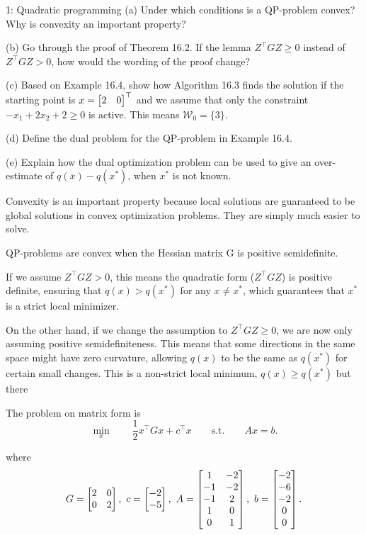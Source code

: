 
\begin{problem}{1: Quadratic programming}
  (a) Under which conditions is a QP-problem convex? Why is convexity an important property?
  
  \medskip (b) Go through the proof of Theorem 16.2. If the lemma $Z^{\top}GZ \geq 0$ instead of $Z^{\top}GZ > 0$, how would the wording of the proof change?
  
  \medskip (c) Based on Example 16.4, show how Algorithm 16.3 finds the solution if the starting point is 
  $x = \begin{bmatrix} 2 & 0 \end{bmatrix}^{\top}$ and we assume that only the constraint $-x_1+2x_2+2\geq 0$ is active. This means $\mathcal{W}_0 = \{3\}$. 
  
  \medskip (d) Define the dual problem for the QP-problem in Example 16.4. 
  
  \medskip (e) Explain how the dual optimization problem can be used to give an over-estimate of $q(\overline{x}) - q(x^*)$, when 
  $x^*$ is not known. 
\end{problem}



Convexity is an important property because local solutions are guaranteed to be global solutions in convex optimization problems. They are simply much easier to solve. 

QP-problems are convex when the Hessian matrix G is positive semidefinite. 


If we assume $Z^{\top}GZ > 0$, this means the quadratic form ($Z^{\top}GZ$) is positive definite, ensuring that $q(x) > q(x^*)$ for any $x  \neq x^*$, which guarantees that $x^*$ is a strict 
local minimizer. 

On the other hand, if we change the assumption to $Z^{\top}GZ \geq 0$, we are now only assuming positive semidefiniteness. 
This means that some directions in the same space might have zero curvature, allowing $q(x)$ to be the same as $q(x^*)$ for certain small changes. This is a non-strict local minimum, $q(x) \geq q(x^*)$ but there 


The problem on matrix form is 
\[
  \min_x \qquad \frac{1}{2}x^{\top}Gx + c^{\top}x \qquad\text{s.t.}\qquad Ax = b
.\] 

where
\[
  G = \begin{bmatrix} 2 & 0 \\ 0 & 2 \end{bmatrix},\  c = \begin{bmatrix} -2 \\ -5 \end{bmatrix},\ A = \begin{bmatrix} 1 & -2 \\ -1 & -2 \\ -1 & 2 \\ 1 & 0 \\ 0 & 1 \end{bmatrix},\  b = \begin{bmatrix} -2 \\ -6 \\ -2 \\ 0 \\ 0 \end{bmatrix}  
.\] 

